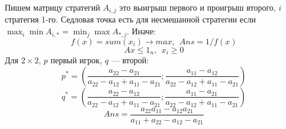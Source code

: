 Пишем матрицу стратегий $A_{i,j}$ это выигрыш первого и проигрыш второго, $i$ стратегия 1-го.
Седловая точка есть для несмешанной стратегии если $\max_{i}\min A_{i,*} = \min_{j}\max A_{*,j}$.
Иначе:
$$
f(x) = sum(x_i) \rightarrow max,\ \ Ans = 1/f(x)
$$
$$
Ax \leq 1_n,\ \ x_i \geq 0
$$
Для $2\times 2$, $p$ первый игрок, $q$ --- второй:
$$
p^* = \left(\frac{a_{22} - a_{21}}{a_{22} - a_{12} + a_{11} - a_{21}}; \frac{a_{11} - a_{12}}{a_{22} - a_{12} + a_{11} - a_{21}} \right)
$$
$$
q^* = \left(\frac{a_{22} - a_{12}}{a_{22} - a_{12} + a_{11} - a_{21}}; \frac{a_{11} - a_{21}}{a_{22} - a_{12} + a_{11} - a_{21}} \right)
$$
$$
Ans = \frac{a_{22}a_{11} - a_{12}a_{21}}{a_{11} + a_{22} - a_{12} - a_{21}}
$$

